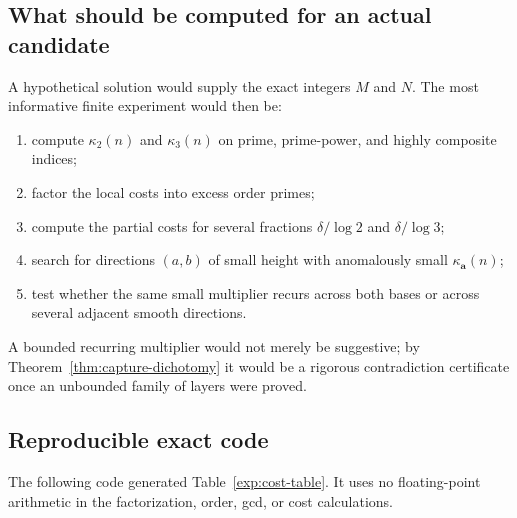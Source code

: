 \documentclass[11pt,oneside]{article}
\theoremstyle{definition}
\theoremstyle{remark}
\begin{document}
\subsection{What should be computed for an actual candidate}

A hypothetical solution would supply the exact integers $M$ and $N$.  The most informative
finite experiment would then be:
\begin{enumerate}[label=\textup{(\roman*)}]
\item compute $\kappa_2(n)$ and $\kappa_3(n)$ on prime, prime-power, and highly composite
indices;
\item factor the local costs into excess order primes;
\item compute the partial costs for several fractions
$\delta/\log2$ and $\delta/\log3$;
\item search for directions $(a,b)$ of small height with anomalously small
$\kappa_{\mathbf a}(n)$;
\item test whether the same small multiplier recurs across both bases or across several
adjacent smooth directions.
\end{enumerate}
A bounded recurring multiplier would not merely be suggestive; by
Theorem~\ref{thm:capture-dichotomy} it would be a rigorous contradiction certificate once an
unbounded family of layers were proved.

\subsection{Reproducible exact code}

The following code generated Table~\ref{exp:cost-table}.  It uses no floating-point
arithmetic in the factorization, order, gcd, or cost calculations.
\end{document}
